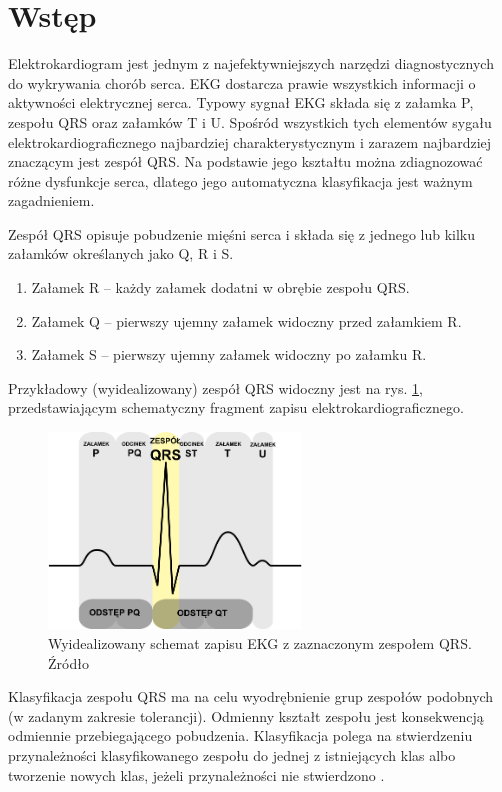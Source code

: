 \section{Wstęp}

\qquad Elektrokardiogram jest jednym z najefektywniejszych narzędzi diagnostycznych do wykrywania chorób serca. EKG dostarcza prawie wszystkich informacji o aktywności elektrycznej serca. Typowy sygnał EKG składa się z załamka P, zespołu QRS oraz załamków T i U. Spośród wszystkich tych elementów sygału elektrokardiograficznego najbardziej charakterystycznym i zarazem najbardziej znaczącym jest zespół QRS. Na podstawie jego kształtu można zdiagnozować różne dysfunkcje serca, dlatego jego automatyczna klasyfikacja jest ważnym zagadnieniem.

Zespół QRS opisuje pobudzenie mięśni serca i składa się z jednego lub kilku załamków określanych jako Q, R i S.
\begin{enumerate}
	\item Załamek R – każdy załamek dodatni w obrębie zespołu QRS.
	\item Załamek Q – pierwszy ujemny załamek widoczny przed załamkiem R.
	\item Załamek S – pierwszy ujemny załamek widoczny po załamku R.
\end{enumerate}

Przykładowy (wyidealizowany) zespół QRS widoczny jest na rys. \ref{fig:QRSComplex}, przedstawiającym schematyczny fragment zapisu elektrokardiograficznego.


\begin{figure}[h]
	\centering
	\includegraphics[width=0.6\textwidth]{Grafika/ZespolQRS}
	\caption{Wyidealizowany schemat zapisu EKG z zaznaczonym zespołem QRS. Źródło  \cite{QRSComplexWiki}}
	\label{fig:QRSComplex}
\end{figure}


Klasyfikacja zespołu QRS ma na celu wyodrębnienie grup zespołów podobnych (w zadanym zakresie tolerancji). Odmienny kształt zespołu jest konsekwencją odmiennie przebiegającego pobudzenia. Klasyfikacja polega na stwierdzeniu przynależności klasyfikowanego zespołu do jednej z istniejących klas albo tworzenie nowych klas, jeżeli przynależności nie stwierdzono \cite{Augustyniak}.

